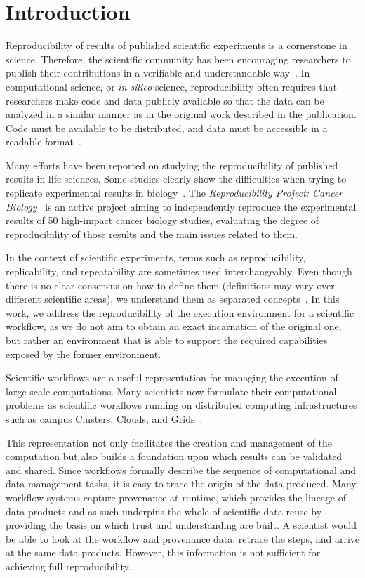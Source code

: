 \section{Introduction}

Reproducibility of results of published scientific experiments is a cornerstone in 
science. Therefore, the scientific community has been encouraging researchers 
to publish their contributions in a verifiable and understandable 
way~\cite{YaleRoundtable09, James-XSEDE-2014}. In computational science, 
or \emph{in-silico} science, reproducibility often requires that researchers make 
code and data publicly available so that the data can be analyzed in a similar 
manner as in the original work described in the publication. Code must be available 
to be distributed, and data must be accessible in a readable format~\cite{bookReproducibility}. 

Many efforts have been reported on studying the reproducibility of published results 
in life sciences. Some studies clearly show the difficulties when trying to replicate 
experimental results in biology~\cite{Ioannidis2009}. The \emph{Reproducibility 
Project: Cancer Biology}~\cite{ErringtonCancerRerpoducibility} is an active project 
aiming to independently reproduce the experimental results of 50 high-impact cancer 
biology studies, evaluating the degree of reproducibility of those results and the main 
issues related to them.

In the context of scientific experiments, terms such as reproducibility, replicability, and 
repeatability are sometimes used interchangeably. Even though there is no clear 
consensus on how to define them (definitions may vary over different scientific areas), 
we understand them as separated concepts~\cite{Drummond2011}. In this work,
we address the reproducibility of the execution environment for a scientific workflow, 
as we do not aim to obtain an exact incarnation of the original one, but rather an 
environment that is able to support the required capabilities exposed by the former 
environment.

Scientific workflows are a useful representation for managing the execution of large-scale 
computations. Many scientists now formulate their computational problems as scientific 
workflows running on distributed computing infrastructures such as campus Clusters, Clouds, 
and Grids~\cite{workflowBook}. 

This representation not only facilitates the creation and management of the computation but also builds a foundation upon which results can be validated and shared. Since workflows formally describe the sequence of computational and data management tasks, it is easy to trace the origin of the data produced. Many workflow systems capture provenance at runtime, which provides the lineage of data products and as such underpins the whole of scientific data reuse by providing the basis on which trust and understanding are built. A scientist would be able to look at the workflow and provenance data, retrace the steps, and arrive at the same data products. 
However, this information is not sufficient for achieving full reproducibility.


